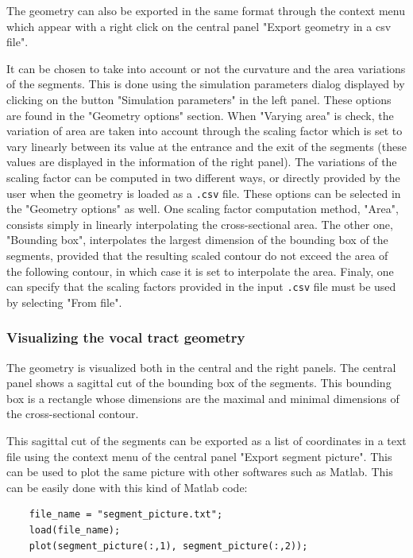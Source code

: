 \documentclass[]{article}
\begin{document}
	The geometry can also be exported in the same format through 
	the context menu which appear with a right click on the central panel
	"Export geometry in a csv file". 
	
	It can be chosen to take into account or not the curvature and 
	the area variations of the segments. This is done using the 
	simulation parameters dialog displayed by clicking on the 
	button "Simulation parameters" in the left panel. 
	These options are found in the "Geometry options" section.
	When "Varying area" is check, the variation of area are taken into 
	account through the scaling factor which is set to vary linearly
	between its value at the entrance and the exit of the segments (these values are displayed in the information of the right panel).
	The variations of the scaling factor can be computed in two different
	ways, or directly provided by the user when the geometry is loaded 
	as a \texttt{.csv} file. These options can be selected in the 
	"Geometry options" as well. One scaling factor computation method, 
	"Area", 
	consists simply in linearly interpolating the cross-sectional area.
	The other one, "Bounding box", interpolates the largest dimension of the bounding 
	box of the segments, provided that the resulting scaled contour 
	do not exceed the area of the following contour, in which case it 
	is set to interpolate the area. 
	Finaly, one can specify that the scaling factors provided in the 
	input \texttt{.csv} file must be used by selecting "From file".
	

	\subsubsection{Visualizing the vocal tract geometry}
	
	The geometry is visualized both in the central and the right panels.
	The central panel shows a sagittal cut of the bounding box of the 
	segments. This bounding box is a rectangle whose dimensions are 
	the maximal and minimal dimensions of the cross-sectional 
	contour.
	
	This sagittal cut of the segments can be exported as a list of 
	coordinates in a text file using the context menu of the central 
	panel "Export segment picture".
	This can be used to plot the same picture with other softwares such 
	as Matlab. This can be easily done with this kind of Matlab code:
	\begin{lstlisting}
	file_name = "segment_picture.txt";
	load(file_name);
	plot(segment_picture(:,1), segment_picture(:,2));
	\end{lstlisting}
	
\end{document}
